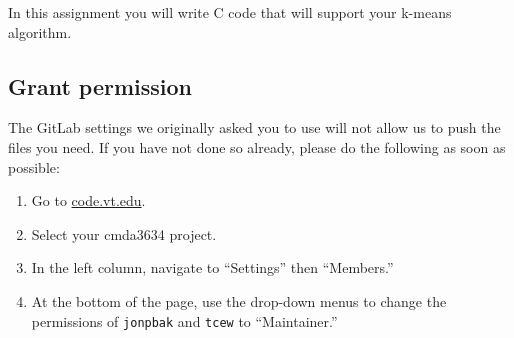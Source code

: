 In this assignment you will write C code that will support your k-means algorithm.
\subsection*{Grant permission}
The GitLab settings we originally asked you to use will not allow us to push the files you need.
If you have not done so already, please do the following as soon as possible:
\begin{enumerate}
    \item Go to \href{http://code.vt.edu}{code.vt.edu}.
    \item Select your cmda3634 project.
    \item In the left column, navigate to ``Settings'' then ``Members.''
    \item At the bottom of the page, use the drop-down menus to change the permissions of \texttt{jonpbak} and \texttt{tcew} to ``Maintainer.''
\end{enumerate}
